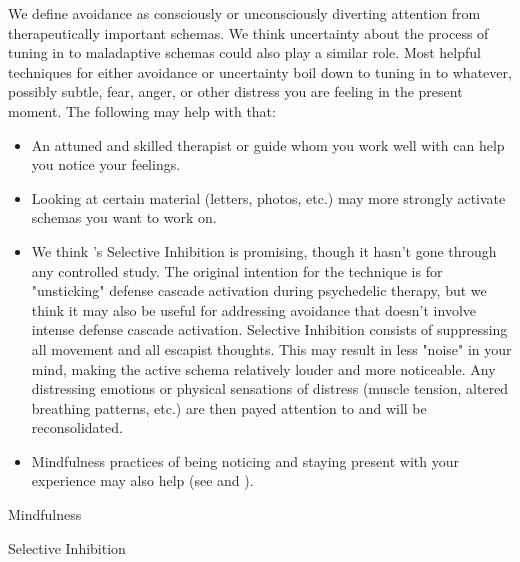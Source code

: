 \documentclass[12pt,letterpaper]{book}
\begin{document}
We define avoidance as consciously or unconsciously diverting attention from therapeutically important schemas. We think uncertainty about the process of tuning in to maladaptive schemas could also play a similar role. Most helpful techniques for either avoidance or uncertainty boil down to tuning in to whatever, possibly subtle, fear, anger, or other distress you are feeling in the present moment. The following may help with that:
\begin{itemize}
	\item An attuned and skilled therapist or guide whom you work well with can help you notice your feelings.
	\item Looking at certain material (letters, photos, etc.) may more strongly activate schemas you want to work on.
	\item \label{selectiveInhibition} We think \textcite{razviPSIP}'s Selective Inhibition is promising, though it hasn't gone through any controlled study. The original intention for the technique is for "unsticking" defense cascade activation during psychedelic therapy, but we think it may also be useful for addressing avoidance that doesn't involve intense defense cascade activation. Selective Inhibition consists of suppressing all movement and all escapist thoughts. This may result in less "noise" in your mind, making the active schema relatively louder and more noticeable. Any distressing emotions or physical sensations of distress (muscle tension, altered breathing patterns, etc.) are then payed attention to and will be reconsolidated.
	\item Mindfulness practices of being noticing and staying present with your experience may also help (see \textcite{rain} and \textcite{bodyscan}).
\end{itemize}

Mindfulness

Selective Inhibition
\end{document}
